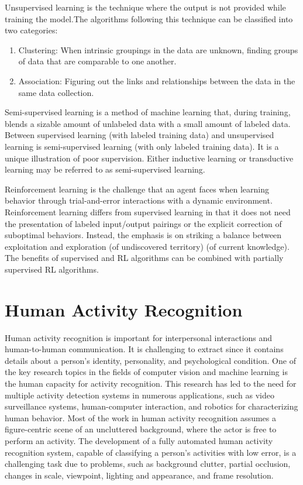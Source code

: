 Unsupervised learning is the technique where the output is not provided while training the model.The algorithms following this technique can be classified into two categories:
\begin{enumerate}
    \item Clustering: When intrinsic groupings in the data are unknown, finding groups of data that are comparable to one another.
    \item Association: Figuring out the links and relationships between the data in the same data collection.
\end{enumerate}

Semi-supervised learning is a method of machine learning that, during training, blends a sizable amount of unlabeled data with a small amount of labeled data. Between supervised learning (with labeled training data) and unsupervised learning is semi-supervised learning (with only labeled training data). It is a unique illustration of poor supervision. Either inductive learning or transductive learning may be referred to as semi-supervised learning.\cite{Zhu071contents}

Reinforcement learning is the challenge that an agent faces when learning behavior through trial-and-error interactions with a dynamic environment. Reinforcement learning differs from supervised learning in that it does not need the presentation of labeled input/output pairings or the explicit correction of suboptimal behaviors. Instead, the emphasis is on striking a balance between exploitation and exploration (of undiscovered territory) (of current knowledge). The benefits of supervised and RL algorithms can be combined with partially supervised RL algorithms.\cite{DBLP:journals/corr/cs-AI-9605103}

\section{Human Activity Recognition}
Human activity recognition is important for interpersonal interactions and human-to-human communication. It is challenging to extract since it contains details about a person's identity, personality, and psychological condition. One of the key research topics in the fields of computer vision and machine learning is the human capacity for activity recognition. This research has led to the need for multiple activity detection systems in numerous applications, such as video surveillance systems, human-computer interaction, and robotics for characterizing human behavior. Most of the work in human activity recognition assumes a figure-centric scene of an uncluttered background, where the actor is free to perform an activity. The development of a fully automated human activity recognition system, capable of classifying a person’s activities with low error, is a challenging task due to problems, such as background clutter, partial occlusion, changes in scale, viewpoint, lighting and appearance, and frame resolution.\cite{10.3389/frobt.2015.00028}

